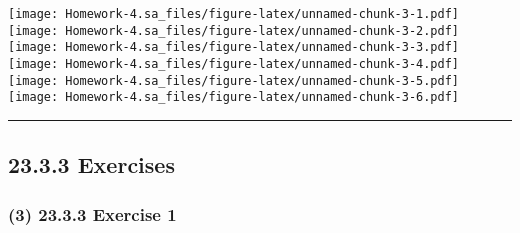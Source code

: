 \documentclass[
]{article}
\newenvironment{Shaded}{\begin{snugshade}}{\end{snugshade}}
\newcommand{\AttributeTok}[1]{\textcolor[rgb]{0.77,0.63,0.00}{#1}}
\newcommand{\DecValTok}[1]{\textcolor[rgb]{0.00,0.00,0.81}{#1}}
\newcommand{\FunctionTok}[1]{\textcolor[rgb]{0.00,0.00,0.00}{#1}}
\newcommand{\NormalTok}[1]{#1}
\newcommand{\OtherTok}[1]{\textcolor[rgb]{0.56,0.35,0.01}{#1}}
\newcommand{\SpecialCharTok}[1]{\textcolor[rgb]{0.00,0.00,0.00}{#1}}
\newcommand{\StringTok}[1]{\textcolor[rgb]{0.31,0.60,0.02}{#1}}
\begin{document}
\begin{Shaded}
\end{Shaded}

\texttt{[image: Homework-4.sa\_files/figure-latex/unnamed-chunk-3-1.pdf]}
\texttt{[image: Homework-4.sa\_files/figure-latex/unnamed-chunk-3-2.pdf]}
\texttt{[image: Homework-4.sa\_files/figure-latex/unnamed-chunk-3-3.pdf]}
\texttt{[image: Homework-4.sa\_files/figure-latex/unnamed-chunk-3-4.pdf]}
\texttt{[image: Homework-4.sa\_files/figure-latex/unnamed-chunk-3-5.pdf]}
\texttt{[image: Homework-4.sa\_files/figure-latex/unnamed-chunk-3-6.pdf]}

\begin{center}\rule{0.5\linewidth}{0.5pt}\end{center}

\hypertarget{exercises-1}{%
\subsection{23.3.3 Exercises}\label{exercises-1}}

\hypertarget{exercise-1-1}{%
\subsubsection{(3) 23.3.3 Exercise 1}\label{exercise-1-1}}
\end{document}
